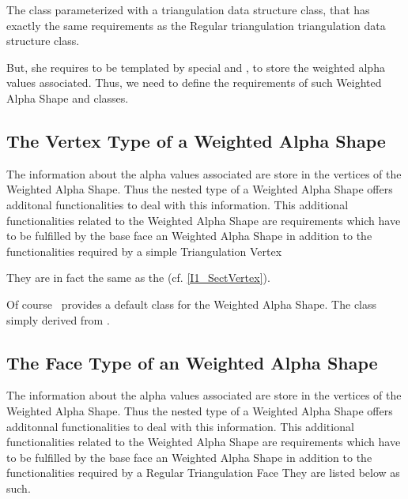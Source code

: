 The class  parameterized with a
triangulation data structure class, that has exactly the same
requirements as the Regular triangulation triangulation data
structure class. 

But, she requires to be templated by special  and
, to store the weighted alpha values associated. Thus, we need to
define the requirements of such Weighted Alpha Shape  and
 classes.

\subsection{The Vertex Type of a Weighted Alpha Shape} 

The information about the alpha values associated  are store in the 
vertices of the Weighted Alpha Shape. Thus the nested 
type of a Weighted Alpha Shape offers additonal functionalities to deal with this information.
This additional functionalities related to the Weighted Alpha Shape
are requirements which have to be fulfilled
by the base face  an Weighted Alpha Shape
in addition to the functionalities required by a simple Triangulation Vertex

They are in fact the same as the 
(cf. \ref{I1_SectVertex}).

Of course  \cgal\ provides a default  class
for the Weighted Alpha Shape. The class
 simply derived from 
.


\subsection{The Face Type of an Weighted Alpha Shape} 

The information about the alpha values associated  are store in the 
vertices of the Weighted Alpha Shape. Thus the nested 
type of a Weighted Alpha Shape offers additonnal functionalities to deal with this information.
This additional functionalities related to the Weighted Alpha Shape
are requirements which have to be fulfilled
by the base face  an Weighted Alpha Shape
in addition to the functionalities required by a Regular Triangulation Face
They are listed below as such.



